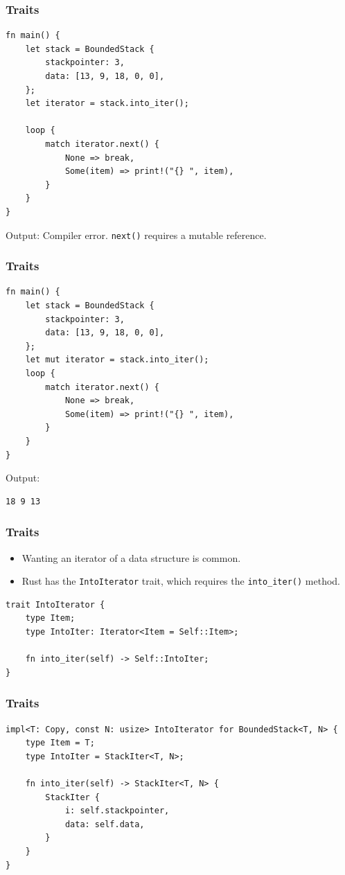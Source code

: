 \begin{frame}[fragile]
    \frametitle{Traits}
    \begin{verbatim}
fn main() {
    let stack = BoundedStack {
        stackpointer: 3,
        data: [13, 9, 18, 0, 0],
    };
    let iterator = stack.into_iter();
    
    loop {
        match iterator.next() {
            None => break,
            Some(item) => print!("{} ", item),
        }
    }
}
    \end{verbatim}
    \pause
    \vfill
    Output:
    \pause
    \vfill
    Compiler error. \texttt{next()} requires a mutable reference.
\end{frame}

\begin{frame}[fragile]
    \frametitle{Traits}
    \begin{verbatim}
fn main() {
    let stack = BoundedStack {
        stackpointer: 3,
        data: [13, 9, 18, 0, 0],
    };
    let mut iterator = stack.into_iter();
    loop {
        match iterator.next() {
            None => break,
            Some(item) => print!("{} ", item),
        }
    }
}
    \end{verbatim}
    \pause
    \vfill
    Output:
    \pause
    \vfill
    \begin{verbatim}
18 9 13  
    \end{verbatim}
\end{frame}

\begin{frame}[fragile]
    \frametitle{Traits}
    \begin{itemize}
        \item Wanting an iterator of a data structure is common.
        \item Rust has the \texttt{IntoIterator} trait, which requires the \texttt{into\_iter()} method.
    \end{itemize}
    \pause
    \vfill
    \begin{verbatim}
trait IntoIterator {
    type Item;
    type IntoIter: Iterator<Item = Self::Item>;

    fn into_iter(self) -> Self::IntoIter;
}
    \end{verbatim}
\end{frame}

\begin{frame}[fragile]
    \frametitle{Traits}
    \begin{verbatim}
impl<T: Copy, const N: usize> IntoIterator for BoundedStack<T, N> {
    type Item = T;
    type IntoIter = StackIter<T, N>;
    
    fn into_iter(self) -> StackIter<T, N> {
        StackIter {
            i: self.stackpointer,
            data: self.data,
        }
    }
}
    \end{verbatim}
\end{frame}


